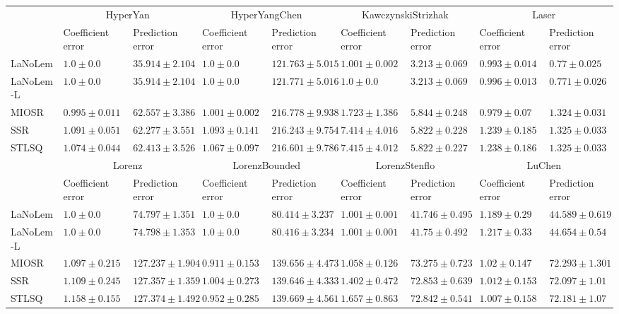 \begin{table*}
{\begin{tabular}{lllllllll}
\midrule

 & \multicolumn{2}{c}{HyperYan} & \multicolumn{2}{c}{HyperYangChen} & \multicolumn{2}{c}{KawczynskiStrizhak} & \multicolumn{2}{c}{Laser} \\
 & Coefficient error & Prediction error & Coefficient error & Prediction error & Coefficient error & Prediction error & Coefficient error & Prediction error \\
\midrule
LaNoLem & $1.0\pm 0.0$ & $\mathbf{35.914}\pm 2.104$ & $\mathbf{1.0}\pm 0.0$ & $\mathbf{121.763}\pm 5.015$ & $1.001\pm 0.002$ & $3.213\pm 0.069$ & $0.993\pm 0.014$ & $\mathbf{0.77}\pm 0.025$ \\
LaNoLem-L & $1.0\pm 0.0$ & $35.914\pm 2.104$ & $1.0\pm 0.0$ & $121.771\pm 5.016$ & $\mathbf{1.0}\pm 0.0$ & $\mathbf{3.213}\pm 0.069$ & $0.996\pm 0.013$ & $0.771\pm 0.026$ \\
MIOSR & $\mathbf{0.995}\pm 0.011$ & $62.557\pm 3.386$ & $1.001\pm 0.002$ & $216.778\pm 9.938$ & $1.723\pm 1.386$ & $5.844\pm 0.248$ & $\mathbf{0.979}\pm 0.07$ & $1.324\pm 0.031$ \\
SSR & $1.091\pm 0.051$ & $62.277\pm 3.551$ & $1.093\pm 0.141$ & $216.243\pm 9.754$ & $7.414\pm 4.016$ & $5.822\pm 0.228$ & $1.239\pm 0.185$ & $1.325\pm 0.033$ \\
STLSQ & $1.074\pm 0.044$ & $62.413\pm 3.526$ & $1.067\pm 0.097$ & $216.601\pm 9.786$ & $7.415\pm 4.012$ & $5.822\pm 0.227$ & $1.238\pm 0.186$ & $1.325\pm 0.033$ \\

\midrule

 & \multicolumn{2}{c}{Lorenz} & \multicolumn{2}{c}{LorenzBounded} & \multicolumn{2}{c}{LorenzStenflo} & \multicolumn{2}{c}{LuChen} \\
 & Coefficient error & Prediction error & Coefficient error & Prediction error & Coefficient error & Prediction error & Coefficient error & Prediction error \\
\midrule
LaNoLem & $\mathbf{1.0}\pm 0.0$ & $\mathbf{74.797}\pm 1.351$ & $1.0\pm 0.0$ & $\mathbf{80.414}\pm 3.237$ & $\mathbf{1.001}\pm 0.001$ & $\mathbf{41.746}\pm 0.495$ & $1.189\pm 0.29$ & $\mathbf{44.589}\pm 0.619$ \\
LaNoLem-L & $1.0\pm 0.0$ & $74.798\pm 1.353$ & $1.0\pm 0.0$ & $80.416\pm 3.234$ & $1.001\pm 0.001$ & $41.75\pm 0.492$ & $1.217\pm 0.33$ & $44.654\pm 0.54$ \\
MIOSR & $1.097\pm 0.215$ & $127.237\pm 1.904$ & $\mathbf{0.911}\pm 0.153$ & $139.656\pm 4.473$ & $1.058\pm 0.126$ & $73.275\pm 0.723$ & $1.02\pm 0.147$ & $72.293\pm 1.301$ \\
SSR & $1.109\pm 0.245$ & $127.357\pm 1.359$ & $1.004\pm 0.273$ & $139.646\pm 4.333$ & $1.402\pm 0.472$ & $72.853\pm 0.639$ & $1.012\pm 0.153$ & $72.097\pm 1.01$ \\
STLSQ & $1.158\pm 0.155$ & $127.374\pm 1.492$ & $0.952\pm 0.285$ & $139.669\pm 4.561$ & $1.657\pm 0.863$ & $72.842\pm 0.541$ & $\mathbf{1.007}\pm 0.158$ & $72.181\pm 1.07$ \\


\end{tabular}}
\end{table*}
